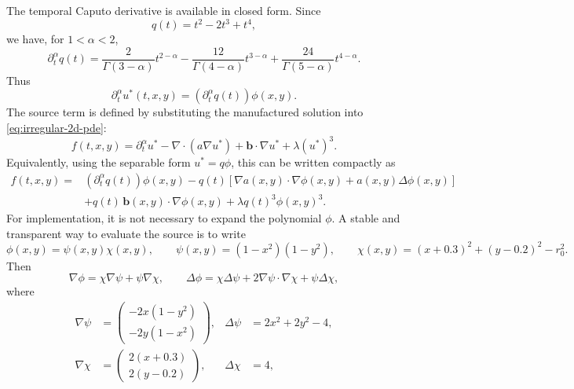 \documentclass[11pt]{article}
\newcommand{\Dtalpha}{\partial_t^\alpha}
\newcommand{\bb}{\bm b}
\newcommand{\grad}{\nabla}
\begin{document}
The temporal Caputo derivative is available in closed form. Since
\[
q(t)=t^2-2t^3+t^4,
\]
we have, for $1<\alpha<2$,
\begin{equation}
 \Dtalpha q(t)
 =
 \frac{2}{\Gamma(3-\alpha)}t^{2-\alpha}
 -
 \frac{12}{\Gamma(4-\alpha)}t^{3-\alpha}
 +
 \frac{24}{\Gamma(5-\alpha)}t^{4-\alpha}.
\label{eq:irregular-2d-caputo-q}
\end{equation}
Thus
\begin{equation}
 \Dtalpha u^\ast(t,x,y)=\left(\Dtalpha q(t)\right)\phi(x,y).
\label{eq:irregular-2d-caputo-u}
\end{equation}
The source term is defined by substituting the manufactured solution into \eqref{eq:irregular-2d-pde}:
\begin{equation}
 f(t,x,y)
 =
 \Dtalpha u^\ast
 -
 \grad\cdot\left(a\grad u^\ast\right)
 +
 \bb\cdot\grad u^\ast
 +
 \lambda (u^\ast)^3.
\label{eq:irregular-2d-source-def}
\end{equation}
Equivalently, using the separable form $u^\ast=q\phi$, this can be written compactly as
\begin{equation}
\begin{aligned}
 f(t,x,y)
 ={}&
 \left(\Dtalpha q(t)\right)\phi(x,y)
 -
 q(t)\left[\grad a(x,y)\cdot\grad\phi(x,y)+a(x,y)\Delta\phi(x,y)\right]
 \\
&
 +
 q(t)\,\bb(x,y)\cdot\grad\phi(x,y)
 +
 \lambda q(t)^3\phi(x,y)^3.
\end{aligned}
\label{eq:irregular-2d-source-compact}
\end{equation}
For implementation, it is not necessary to expand the polynomial $\phi$. A stable and transparent way to evaluate the source is to write
\begin{equation}
 \phi(x,y)=\psi(x,y)\chi(x,y),
 \qquad
 \psi(x,y)=(1-x^2)(1-y^2),
 \qquad
 \chi(x,y)=(x+0.3)^2+(y-0.2)^2-r_0^2.
\label{eq:irregular-2d-psi-chi}
\end{equation}
Then
\begin{equation}
 \grad\phi=\chi\grad\psi+\psi\grad\chi,
 \qquad
 \Delta\phi=\chi\Delta\psi+2\grad\psi\cdot\grad\chi+\psi\Delta\chi,
\label{eq:irregular-2d-phi-derivatives}
\end{equation}
where
\begin{equation}
\begin{aligned}
 \grad\psi
 &=
 \begin{pmatrix}
 -2x(1-y^2)\\
 -2y(1-x^2)
 \end{pmatrix},
&
 \Delta\psi
 &=2x^2+2y^2-4,\\
 \grad\chi
 &=
 \begin{pmatrix}
 2(x+0.3)\\
 2(y-0.2)
 \end{pmatrix},
&
 \Delta\chi
 &=4,
\end{aligned}
\label{eq:irregular-2d-aux-derivatives}
\end{equation}
\end{document}
